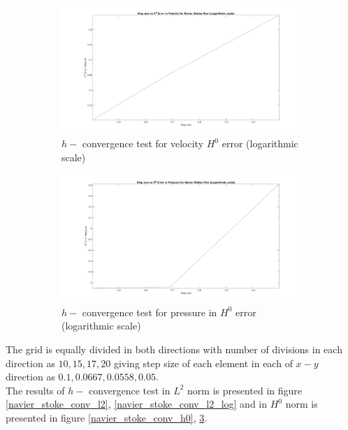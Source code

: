 \documentclass[a4paper]{book}
\begin{document}
\begin{figure}
\begin{subfigure}{\textwidth}	
  \includegraphics[width=\linewidth]{H0_convergence_velocity_n_s_log.jpg}
  \caption{$h-$ convergence test for velocity $H^0$ error (logarithmic scale)}
  \label{fig:vel_navier_stoke_conv_log_h0}
\end{subfigure}
\begin{subfigure}{\textwidth}	
  \includegraphics[width=\linewidth]{H0_convergence_pressure_n_s_log.jpg}
  \caption{$h-$ convergence test for pressure in $H^0$ error (logarithmic scale)}
  \label{fig:pre_navier_stoke_conv_log_h0}
\end{subfigure}
\caption{\label{navier_stoke_conv_h0_log}}
\end{figure}

The grid is equally divided in both directions with number of divisions in each direction as $10,15,17,20$ giving step size of each element in each of $x-y$ direction as $0.1,0.0667,0.0558,0.05$.\\

The results of $h-$ convergence test in $L^2$ norm is presented in figure \ref{navier_stoke_conv_l2}, \ref{navier_stoke_conv_l2_log} and in $H^0$ norm is presented in figure \ref{navier_stoke_conv_h0}, \ref{navier_stoke_conv_h0_log}. \\
\end{document}
